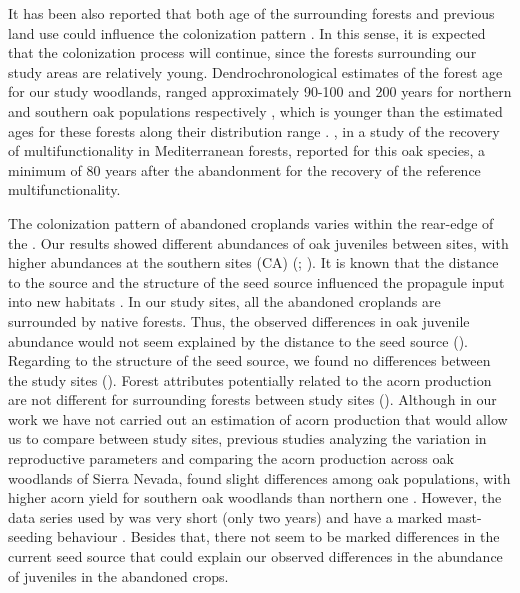 It has been also reported that both age of the surrounding forests and previous land use could influence the colonization pattern \autocite{MinottaDegioanni2011NaturallyRegenerated}. In this sense, it is expected that the colonization process will continue, since the forests surrounding our study areas are relatively young. Dendrochronological estimates of the forest age for our study woodlands, ranged approximately 90-100 and 200 years for northern and southern oak populations respectively \autocite{PerezLuqueetal2020LanduseLegacies, GeaIzquierdoCanellas2014LocalClimate}, which is younger than the estimated ages for these forests along their distribution range \autocites{GeaIzquierdoCanellas2014LocalClimate}. \citet{CruzAlonsoetal2019LongTerm}, in a study of the recovery of multifunctionality in Mediterranean forests, reported for this oak species, a minimum of 80 years after the abandonment for the recovery of the reference multifunctionality. 

The colonization pattern of abandoned croplands varies within the rear-edge of the \Qp. Our results showed different abundances of oak juveniles between sites, with higher abundances at the southern sites (CA) (; ). It is known that the distance to the source and the structure of the seed source influenced the propagule input into new habitats \autocites{Nathan2006LongDistanceDispersal,HewittKellman2002TreeSeed,Kureketal2019DispersalDistance}. In our study sites, all the abandoned croplands are surrounded by native forests. Thus, the observed differences in oak juvenile abundance would not seem explained by the distance to the seed source (). Regarding to the structure of the seed source, we found no differences between the study sites (). Forest attributes potentially related to the acorn production \autocite[\emph{e.g.} tree density, basal area,][]{GeaIzquierdoetal2006AcornProduction} are not different for surrounding forests between study sites (). Although in our work we have not carried out an estimation of acorn production that would allow us to compare between study sites, previous studies analyzing the variation in reproductive parameters and comparing the acorn production across oak woodlands of Sierra Nevada, found slight differences among oak populations, with higher acorn yield for southern oak woodlands than northern one \autocite{Leal2013AnalisisCrecimiento}.  However, the data series used by \citet{Leal2013AnalisisCrecimiento} was very short (only two years) and \Qpy have a marked mast-seeding behaviour \autocites{Bravoetal2008SelviculturaMontes,Gomezetal2001ProblemasRegeneracion}. Besides that, there not seem to be marked differences in the current seed source that could explain our observed differences in the abundance of juveniles in the abandoned crops. 

